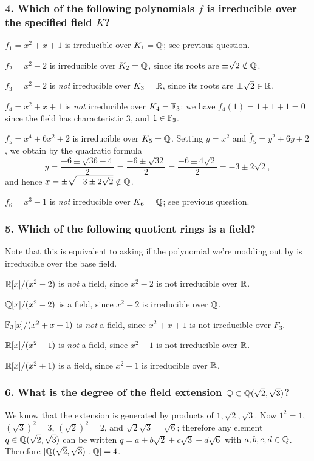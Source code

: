 \subsubsection*{4. Which of the following polynomials $f$ is irreducible over the specified field $K$?}
$f_1 = x^2 + x + 1$ is irreducible over $K_1 = \mathbb{Q}$; see previous question.

$f_2 = x^2 - 2$ is irreducible over $K_2 = \mathbb{Q}$, since its roots are $\pm \sqrt{2} \notin \mathbb{Q}$.

$f_3 = x^2 - 2$ is \emph{not} irreducible over $K_3 = \mathbb{R}$, since its roots are $\pm \sqrt{2} \in \mathbb{R}$.

$f_4 = x^2 + x + 1$ is \emph{not} irreducible over $K_4 = \mathbb{F}_3$: we have $f_4(1) = 1 + 1 + 1 = 0$ since the field has characteristic $3$, and $1 \in \mathbb{F}_3$.

$f_5 = x^4 + 6x^2 + 2$ is irreducible over $K_5 = \mathbb{Q}$. Setting $y = x^2$ and $\hat{f}_5 = y^2 + 6y + 2$, we obtain by the quadratic formula \[y = \frac{-6 \pm \sqrt{36 - 4}}{2} = \frac{-6 \pm \sqrt{32}}{2} = \frac{-6 \pm 4\sqrt{2}}{2} = -3 \pm 2 \sqrt{2},\] and hence $x = \pm \sqrt{-3 \pm 2 \sqrt{2}} \notin \mathbb{Q}$.

$f_6 = x^3 - 1$ is \emph{not} irreducible over $K_6 = \mathbb{Q}$; see previous question.

\subsubsection*{5. Which of the following quotient rings is a field?}
Note that this is equivalent to asking if the polynomial we're modding out by is irreducible over the base field.

$\mathbb{R}[x]/(x^2 - 2)$ is \emph{not} a field, since $x^2 - 2$ is not irreducible over $\mathbb{R}$.

$\mathbb{Q}[x]/(x^2 - 2)$ is a field, since $x^2 - 2$ is irreducible over $\mathbb{Q}$.

$\mathbb{F}_3[x]/(x^2 + x + 1)$ is \emph{not} a field, since $x^2 + x + 1$ is not irreducible over $F_3$.

$\mathbb{R}[x]/(x^2 - 1)$ is \emph{not} a field, since $x^2 - 1$ is not irreducible over $\mathbb{R}$.

$\mathbb{R}[x]/(x^2 + 1)$ is a field, since $x^2 + 1$ is irreducible over $\mathbb{R}$.

\subsubsection*{6. What is the degree of the field extension $\mathbb{Q} \subset \mathbb{Q}(\sqrt{2}, \sqrt{3})$?}
We know that the extension is generated by products of $1, \sqrt{2}, \sqrt{3}$. Now $1^2 = 1$, $(\sqrt{3})^2 = 3$, $(\sqrt{2})^2 = 2$, and $\sqrt{2}\sqrt{3} = \sqrt{6}$; therefore any element $q \in \mathbb{Q}(\sqrt{2}, \sqrt{3})$ can be written $q = a + b\sqrt{2} + c\sqrt{3} + d\sqrt{6}$ with $a, b, c, d \in \mathbb{Q}$. Therefore $[\mathbb{Q}(\sqrt{2}, \sqrt{3}) : \mathbb{Q}] = 4$.